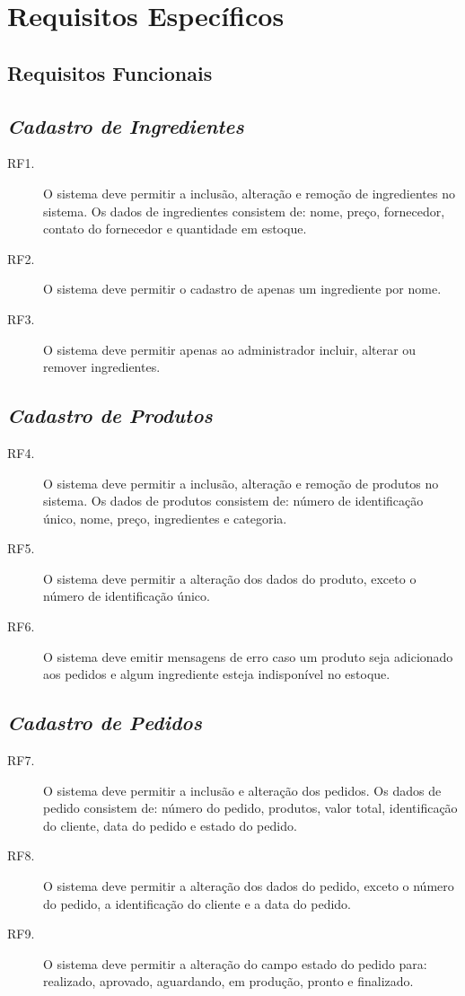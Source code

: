\documentclass[article, 12pt, oneside, a4paper, brazil]{abntex2}
\begin{document}
 \section{Requisitos Específicos} 
 \subsection{Requisitos Funcionais}
 
 \subsection*{\emph{Cadastro de Ingredientes}}
 \begin{description}
  \item[RF1.] O sistema deve permitir a inclusão, alteração e remoção de ingredientes no sistema. Os dados de ingredientes consistem de: nome, preço, fornecedor, contato do fornecedor e quantidade em estoque.
  \item[RF2.] O sistema deve permitir o cadastro de apenas um ingrediente por nome.
  \item[RF3.] O sistema deve permitir apenas ao administrador incluir, alterar ou remover ingredientes.
 \end{description}

 \subsection*{\emph{Cadastro de Produtos}}
 \begin{description}
  \item [RF4.] O sistema deve permitir a inclusão, alteração e remoção de produtos no sistema. Os dados de produtos consistem de: número de identificação único, nome, preço, ingredientes e categoria.
  \item [RF5.] O sistema deve permitir a alteração dos dados do produto, exceto o número de identificação único.
  \item [RF6.] O sistema deve emitir mensagens de erro caso um produto seja adicionado aos pedidos e algum ingrediente esteja indisponível no estoque.
 \end{description}
 
 \subsection*{\emph{Cadastro de Pedidos}}
 \begin{description}
  \item [RF7.] O sistema deve permitir a inclusão e alteração dos pedidos. Os dados de pedido consistem de: número do pedido, produtos, valor total, identificação do cliente, data do pedido e estado do pedido.
  \item [RF8.] O sistema deve permitir a alteração dos dados do pedido, exceto o número do pedido, a identificação do cliente e a data do pedido.
  \item [RF9.] O sistema deve permitir a alteração do campo estado do pedido para: realizado, aprovado, aguardando, em produção, pronto e finalizado.
 \end{description}
 
\end{document}
